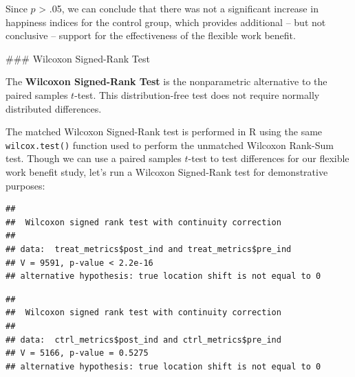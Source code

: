 \documentclass[]{book}
\newenvironment{Shaded}{\begin{snugshade}}{\end{snugshade}}
\newcommand{\CommentTok}[1]{\textcolor[rgb]{0.56,0.35,0.01}{\textit{#1}}}
\newcommand{\DataTypeTok}[1]{\textcolor[rgb]{0.13,0.29,0.53}{#1}}
\newcommand{\KeywordTok}[1]{\textcolor[rgb]{0.13,0.29,0.53}{\textbf{#1}}}
\newcommand{\NormalTok}[1]{#1}
\newcommand{\OperatorTok}[1]{\textcolor[rgb]{0.81,0.36,0.00}{\textbf{#1}}}
\newcommand{\OtherTok}[1]{\textcolor[rgb]{0.56,0.35,0.01}{#1}}
\begin{document}
Since \(p\) \textgreater{} .05, we can conclude that there was not a significant increase in happiness indices for the control group, which provides additional -- but not conclusive -- support for the effectiveness of the flexible work benefit.

\#\#\# Wilcoxon Signed-Rank Test

The \textbf{Wilcoxon Signed-Rank Test} is the nonparametric alternative to the paired samples \(t\)-test. This distribution-free test does not require normally distributed differences.

The matched Wilcoxon Signed-Rank test is performed in R using the same \texttt{wilcox.test()} function used to perform the unmatched Wilcoxon Rank-Sum test. Though we can use a paired samples \(t\)-test to test differences for our flexible work benefit study, let's run a Wilcoxon Signed-Rank test for demonstrative purposes:

\begin{Shaded}
\end{Shaded}

\begin{verbatim}
## 
##  Wilcoxon signed rank test with continuity correction
## 
## data:  treat_metrics$post_ind and treat_metrics$pre_ind
## V = 9591, p-value < 2.2e-16
## alternative hypothesis: true location shift is not equal to 0
\end{verbatim}

\begin{Shaded}
\end{Shaded}

\begin{verbatim}
## 
##  Wilcoxon signed rank test with continuity correction
## 
## data:  ctrl_metrics$post_ind and ctrl_metrics$pre_ind
## V = 5166, p-value = 0.5275
## alternative hypothesis: true location shift is not equal to 0
\end{verbatim}
\end{document}
